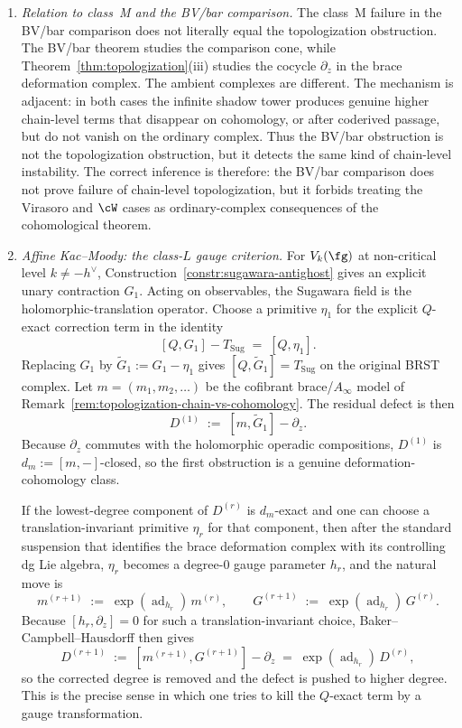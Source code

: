 \begin{remark}
\begin{enumerate}[label=\textup{(\roman*)}]
\item \emph{Relation to class~M and the BV/bar comparison.}
 The class~M failure in the BV/bar comparison does not literally equal the
 topologization obstruction. The BV/bar theorem studies the comparison cone,
 while Theorem~\ref{thm:topologization}\textup{(iii)} studies the
 cocycle $\partial_z$ in the brace deformation complex. The ambient
 complexes are different. The mechanism is adjacent: in both cases
 the infinite shadow tower produces genuine higher chain-level terms
 that disappear on cohomology, or after coderived passage, but do
 not vanish on the ordinary complex. Thus the BV/bar obstruction is
 not the topologization obstruction, but it detects the same kind of
 chain-level instability. The correct inference is therefore:
 the BV/bar comparison does not prove failure of chain-level
 topologization, but it forbids treating the Virasoro and $\cW$ cases
 as ordinary-complex consequences of the cohomological theorem.

\item \emph{Affine Kac--Moody: the class-$L$ gauge criterion.}
 For $V_k(\fg)$ at non-critical level
 $k \neq -h^\vee$, Construction~\ref{constr:sugawara-antighost}
 gives an explicit unary contraction $G_1$. Acting on observables,
 the Sugawara field is the holomorphic-translation operator. Choose
 a primitive $\eta_1$ for the explicit $Q$-exact correction term in
 the identity
 \[
 [Q,G_1] - T_{\mathrm{Sug}} \;=\; [Q,\eta_1].
 \]
 Replacing $G_1$ by
 $\widetilde G_1 := G_1 - \eta_1$ gives
 $[Q,\widetilde G_1] = T_{\mathrm{Sug}}$ on the original BRST
 complex. Let
 $m = (m_1,m_2,\ldots)$ be the cofibrant brace/$A_\infty$ model of
 Remark~\ref{rem:topologization-chain-vs-cohomology}. The residual
 defect is then
 \[
 D^{(1)} \;:=\; [m,\widetilde G_1] - \partial_z.
 \]
 Because $\partial_z$ commutes with the holomorphic operadic
 compositions, $D^{(1)}$ is $d_m := [m,-]$-closed, so the first
 obstruction is a genuine deformation-cohomology class.

 If the lowest-degree component of $D^{(r)}$ is $d_m$-exact and one
 can choose a translation-invariant primitive $\eta_r$ for that
 component, then after the standard suspension that identifies the
 brace deformation complex with its controlling dg Lie algebra,
 $\eta_r$ becomes a degree-$0$ gauge parameter $h_r$, and the
 natural move is
 \[
 m^{(r+1)} \;:=\; \exp(\operatorname{ad}_{h_r})\,m^{(r)},
 \qquad
 G^{(r+1)} \;:=\; \exp(\operatorname{ad}_{h_r})\,G^{(r)}.
 \]
 Because $[h_r,\partial_z]=0$ for such a translation-invariant choice,
 Baker--Campbell--Hausdorff then gives
 \[
 D^{(r+1)}
 \;:=\;
 [m^{(r+1)},G^{(r+1)}]-\partial_z
 \;=\;
 \exp(\operatorname{ad}_{h_r})\,D^{(r)},
 \]
 so the corrected degree is removed and the defect is pushed to
 higher degree. This is the precise sense in which one tries to kill
 the $Q$-exact term by a gauge transformation.


\end{enumerate}
\end{remark}
